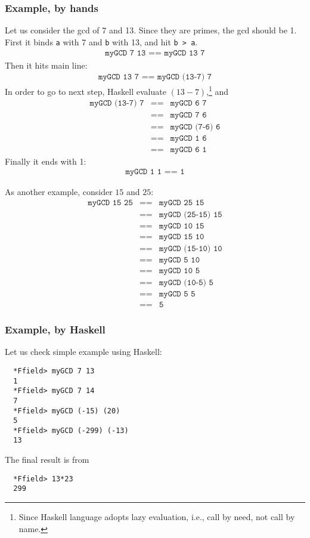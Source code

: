\documentclass[11pt]{book}
\begin{document}
\subsubsection{Example, by hands}
Let us consider the gcd of 7 and 13.
Since they are primes, the gcd should be 1.
First it binds \texttt{a} with 7 and \texttt{b} with 13, and hit \texttt{b > a}.
\begin{eqnarray}
\texttt{myGCD 7 13 == myGCD 13 7}
\end{eqnarray}
Then it hits main line:
\begin{eqnarray}
\texttt{myGCD 13 7 == myGCD (13-7) 7}
\end{eqnarray}
In order to go to next step, Haskell evaluate $(13-7)$,\footnote{
Since Haskell language adopts lazy evaluation, i.e., call by need, not call by name.
}
and
\begin{eqnarray}
\texttt{myGCD (13-7) 7} &\texttt{==}& \texttt{myGCD 6 7} \\
&\texttt{==}& \texttt{myGCD 7 6} \\
&\texttt{==}& \texttt{myGCD (7-6) 6} \\
&\texttt{==}& \texttt{myGCD 1 6} \\
&\texttt{==}& \texttt{myGCD 6 1}
\end{eqnarray}
Finally it ends with 1:
\begin{eqnarray}
\texttt{myGCD 1 1 == 1} 
\end{eqnarray}

As another example, consider $15$ and $25$:
\begin{eqnarray}
\texttt{myGCD 15 25} &\texttt{==}& \texttt{myGCD 25 15}\\
&\texttt{==}& \texttt{myGCD (25-15) 15}\\
&\texttt{==}& \texttt{myGCD 10 15}\\
&\texttt{==}& \texttt{myGCD 15 10}\\
&\texttt{==}& \texttt{myGCD (15-10) 10}\\
&\texttt{==}& \texttt{myGCD 5 10}\\
&\texttt{==}& \texttt{myGCD 10 5}\\
&\texttt{==}& \texttt{myGCD (10-5) 5}\\
&\texttt{==}& \texttt{myGCD 5 5}\\
&\texttt{==}& \texttt{5}
\end{eqnarray}

\subsubsection{Example, by Haskell}
Let us check simple example using Haskell:
\begin{verbatim}
  *Ffield> myGCD 7 13
  1
  *Ffield> myGCD 7 14
  7
  *Ffield> myGCD (-15) (20)
  5
  *Ffield> myGCD (-299) (-13)
  13
\end{verbatim}
The final result is from
\begin{verbatim}
  *Ffield> 13*23
  299
\end{verbatim}
\end{document}
